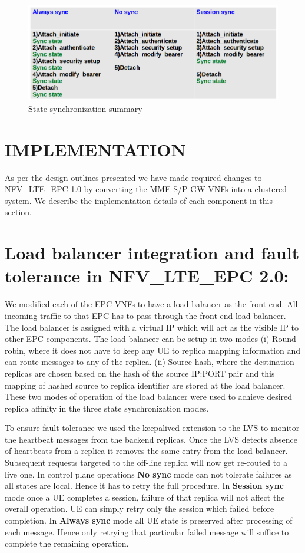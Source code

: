 \documentclass[hidelinks]{report}
\begin{document}
\begin{figure}[H]	
\centering
\includegraphics[scale= 0.39]{images/sync_designs.png}
\caption{State synchronization summary}
\label{fig:sss}
\end{figure}

\section*{IMPLEMENTATION}
\label{sec:imp}
As per the design outlines presented we have made required changes to NFV\_LTE\_EPC 1.0 by converting the MME S/P-GW VNFs into a clustered system. We describe the implementation details of each component in this section.

\section*{Load balancer integration and fault tolerance in NFV\_LTE\_EPC 2.0:}

We modified each of the EPC VNFs to have a load balancer as the front end. All incoming traffic to that EPC has to pass through the front end load balancer. The load balancer is assigned with a virtual IP which will act as the visible IP to other EPC components. The load balancer can be setup in two modes (i) Round robin, where it does not have to keep any UE to replica mapping information and can route messages to any of the replica. (ii) Source hash, where the destination replicas are chosen based on the hash of the source IP:PORT pair and this mapping of hashed source to replica identifier are stored at the load balancer. These two modes of operation of the load balancer were used to achieve  desired replica affinity in the three state  synchronization modes. 
\par To ensure fault tolerance we used the keepalived extension to the LVS to monitor the heartbeat messages from the backend replicas. Once the LVS detects absence of heartbeats from a replica it removes the same entry from the load balancer. Subsequent requests targeted to the off-line replica will now get re-routed to a live one. In control plane operations \textbf{No sync} mode can not tolerate failures as all states are local. Hence it has to retry the full procedure. In \textbf{Session sync} mode once a UE completes a session, failure of that replica will not affect the overall operation. UE can simply retry only the session which failed before completion.
In \textbf{Always sync} mode all UE state is preserved after processing of each message. Hence only retrying that particular failed message will suffice to complete the remaining operation.
\end{document}
